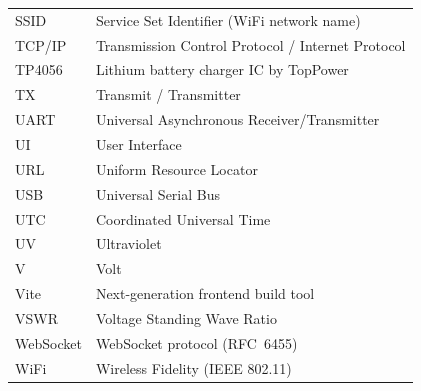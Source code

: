 \begin{longtable}{p{3.2cm} p{10cm}}
SSID  & Service Set Identifier (WiFi network name) \\
TCP/IP & Transmission Control Protocol / Internet Protocol \\
TP4056 & Lithium battery charger IC by TopPower \\
TX    & Transmit / Transmitter \\
UART  & Universal Asynchronous Receiver/Transmitter \\
UI    & User Interface \\
URL   & Uniform Resource Locator \\
USB   & Universal Serial Bus \\
UTC   & Coordinated Universal Time \\
UV    & Ultraviolet \\
V     & Volt \\
Vite  & Next-generation frontend build tool \\
VSWR  & Voltage Standing Wave Ratio \\
WebSocket & WebSocket protocol (RFC~6455) \\
WiFi  & Wireless Fidelity (IEEE 802.11) \\
\bottomrule
\end{longtable}
